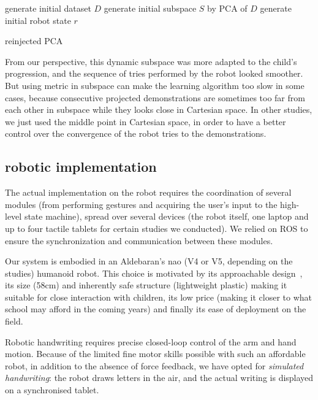 \documentclass{sig-alternate}
\begin{document}
\begin{algorithm}
   generate initial dataset $D$\;
   generate initial subspace $S$ by PCA of $D$\;
   generate initial robot state $r$\;
   \caption{reinjected PCA}
\end{algorithm}

From our perspective, this dynamic subspace was more adapted to the child's
progression, and the sequence of tries performed by the robot looked smoother.
But using metric in subspace can make the learning algorithm too slow in some
cases, because consecutive projected demonstrations are sometimes too
far from each other in subspace while they looks close in Cartesian space.
In other studies, we just used the middle point in Cartesian space, in order to
have a better control over the convergence of the robot tries to the demonstrations.


\subsection{robotic implementation}

The actual implementation on the robot requires the coordination of
several modules (from performing gestures and acquiring the user's input to
the high-level state machine), spread over several devices (the robot itself,
one laptop and up to four tactile tablets for certain studies we conducted). We
relied on ROS to ensure the synchronization and communication between these
modules.

Our system is embodied in an Aldebaran's {\sc nao} (V4 or V5, depending on the
studies) humanoid robot. This choice is motivated by its approachable
design~\cite{Gouaillier2008}, its size (58cm) and inherently safe structure
(lightweight plastic) making it suitable for close interaction with children,
its low price (making it closer to what school may afford in the coming years)
and finally its ease of deployment on the field.

Robotic handwriting requires precise closed-loop control of the arm and hand
motion. Because of the limited fine motor skills possible with such an
affordable robot, in addition to the absence of force feedback, we have opted
for \emph{simulated handwriting}: the robot draws letters in the air, and the
actual writing is displayed on a synchronised tablet.
\end{document}

